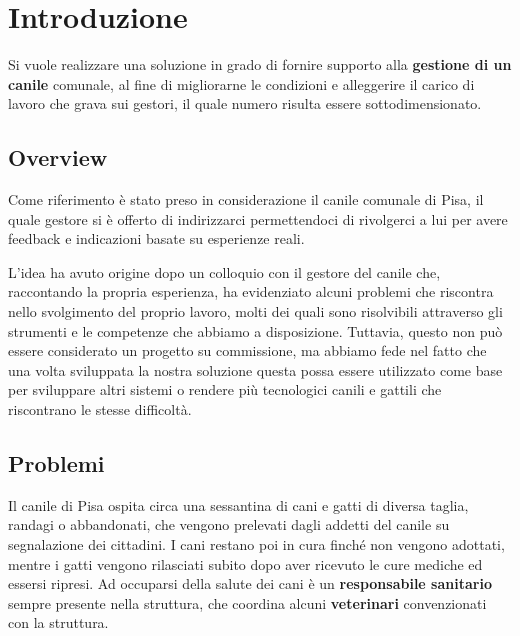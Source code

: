 

\chapter{Introduzione}
Si vuole realizzare una soluzione in grado di fornire supporto alla
\textbf{gestione di un canile} comunale, al fine di migliorarne le condizioni e alleggerire il carico di lavoro che grava sui gestori, il quale numero risulta essere sottodimensionato.

\section{Overview}
Come riferimento è stato preso in considerazione il  canile comunale di Pisa, il quale gestore si è offerto di indirizzarci permettendoci di rivolgerci a lui per avere feedback e indicazioni basate su esperienze reali.

L'idea ha avuto origine dopo un colloquio con il gestore del canile che, raccontando la propria esperienza, ha evidenziato alcuni problemi che riscontra nello svolgimento del proprio lavoro, molti dei quali sono risolvibili attraverso gli strumenti e le competenze che abbiamo a disposizione. Tuttavia, questo non può essere considerato un progetto su commissione, ma abbiamo fede nel fatto che una volta sviluppata la nostra soluzione questa possa essere utilizzato come base per sviluppare altri sistemi o rendere più tecnologici canili e gattili che riscontrano le stesse difficoltà.

\section{Problemi}
Il canile di Pisa ospita circa una sessantina di cani e gatti di diversa taglia, randagi o abbandonati, che vengono prelevati dagli addetti del canile su segnalazione dei cittadini. I cani restano poi in cura finché non vengono adottati, mentre i gatti vengono rilasciati subito dopo aver ricevuto le cure  mediche ed essersi ripresi. Ad occuparsi della salute dei cani è un \textbf{responsabile sanitario} sempre presente nella struttura, che coordina alcuni \textbf{veterinari} convenzionati con la struttura.

